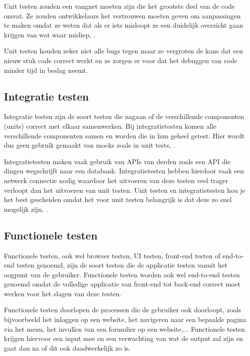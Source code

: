 Unit testen zouden een vangnet moeten zijn die het grootste deel van de code omvat. Ze zouden ontwikkelaars het vertrouwen moeten geven om aanpassingen te maken omdat ze weten dat als er iets misloopt ze een duidelijk overzicht gaan krijgen van wat waar misliep, \textcite{Zilberfeld2013}.

Unit testen houden zeker niet alle bugs tegen maar ze vergroten de kans dat een nieuw stuk code correct werkt en ze zorgen er voor dat het debuggen van code minder tijd in beslag neemt.

\subsection{Integratie testen}

Integratie testen zijn de soort testen die nagaan of de verschillende componenten (units) correct met elkaar samenwerken. Bij integratietesten komen alle verschillende componenten samen en worden die in hun geheel getest. Hier wordt dus geen gebruik gemaakt van \glspl{mock} zoals in unit tests, \textcite{Reselman2017}.

Integratietesten maken vaak gebruik van \glspl{API} van derden zoals een API die dingen wegschrijft naar een databank. Integratietesten hebben hierdoor vaak een netwerk connectie nodig waardoor het uitvoeren van deze testen veel trager verloopt dan het uitvoeren van unit testen. Unit testen en integratietesten hou je het best gescheiden omdat het voor unit testen belangrijk is dat deze zo snel mogelijk zijn, \autocite{Elliott2016}.

\subsection{Functionele testen}

Functionele testen, ook wel browser testen, UI testen, front-end testen of end-to-end testen genoemd, zijn de soort testen die de applicatie testen vanuit het oogpunt van de gebruiker. Functionele testen worden ook wel end-to-end testen genoemd omdat de volledige applicatie van front-end tot back-end correct moet werken voor het slagen van deze testen.

Functionele testen doorlopen de processen die de gebruiker ook doorloopt, zoals bijvoorbeeld het inloggen op een website, het navigeren naar een bepaalde pagina via het menu, het invullen van een formulier op een website,... Functionele testen krijgen hiervoor een input mee en een verwachting van wat de output zal zijn en gaat dan na of dit ook daadwerkelijk zo is.


